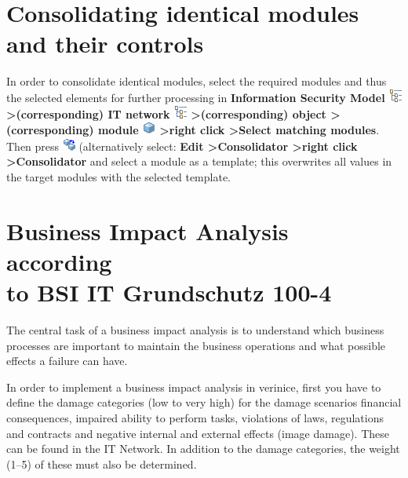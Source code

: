 \documentclass[a4paper,10pt]{book}
\begin{document}
 \section{Consolidating identical modules and their controls}
 In order to consolidate identical modules, select the required modules and thus the
 selected elements for further processing in \textbf{Information Security Model
\includegraphics[height=2ex]{Icon/GS_Modell.png} \textgreater (corresponding) IT network
\includegraphics[height=2ex]{Icon/GS_Modell.png} \textgreater (corresponding) object \textgreater
(corresponding) module \includegraphics[height=2ex]{Icon/Baustein.png} \textgreater right click
\textgreater Select matching modules}. Then press \includegraphics[height=2ex]{Icon/Konsolidator.png}
(alternatively select: \textbf{Edit \textgreater Consolidator \textgreater right click \textgreater Consolidator}
and select a module as a template; this overwrites all values in the target modules with the selected template.


\section{Business Impact Analysis according\\ to BSI IT Grundschutz 100-4}
\label{sec:business-impact-analyse-nach-bsi-it-grundschutz-100-4}

The central task of a business impact analysis is to understand which business
processes are important to maintain the business operations and what possible
effects a failure can have.

In order to implement a business impact analysis in verinice, first you have to
define the damage categories (low to very high) for the damage scenarios
financial consequences, impaired ability to perform tasks, violations of laws,
regulations and contracts and negative internal and external effects (image
damage). These can be found in the IT Network. In addition to the damage
categories, the weight (1--5) of these must also be determined.
\end{document}
